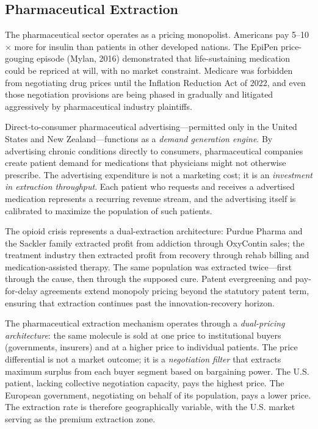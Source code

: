 \subsection{Pharmaceutical Extraction}

The pharmaceutical sector operates as a pricing monopolist. Americans pay 5--10$\times$ more for insulin than patients in other developed nations. The EpiPen price-gouging episode (Mylan, 2016) demonstrated that life-sustaining medication could be repriced at will, with no market constraint. Medicare was forbidden from negotiating drug prices until the Inflation Reduction Act of 2022, and even those negotiation provisions are being phased in gradually and litigated aggressively by pharmaceutical industry plaintiffs.

Direct-to-consumer pharmaceutical advertising---permitted only in the United States and New Zealand---functions as a \textit{demand generation engine}. By advertising chronic conditions directly to consumers, pharmaceutical companies create patient demand for medications that physicians might not otherwise prescribe. The advertising expenditure is not a marketing cost; it is an \textit{investment in extraction throughput}. Each patient who requests and receives a advertised medication represents a recurring revenue stream, and the advertising itself is calibrated to maximize the population of such patients.

The opioid crisis represents a dual-extraction architecture: Purdue Pharma and the Sackler family extracted profit from addiction through OxyContin sales; the treatment industry then extracted profit from recovery through rehab billing and medication-assisted therapy. The same population was extracted twice---first through the cause, then through the supposed cure. Patent evergreening and pay-for-delay agreements extend monopoly pricing beyond the statutory patent term, ensuring that extraction continues past the innovation-recovery horizon.

The pharmaceutical extraction mechanism operates through a \textit{dual-pricing architecture}: the same molecule is sold at one price to institutional buyers (governments, insurers) and at a higher price to individual patients. The price differential is not a market outcome; it is a \textit{negotiation filter} that extracts maximum surplus from each buyer segment based on bargaining power. The U.S. patient, lacking collective negotiation capacity, pays the highest price. The European government, negotiating on behalf of its population, pays a lower price. The extraction rate is therefore geographically variable, with the U.S. market serving as the premium extraction zone.

